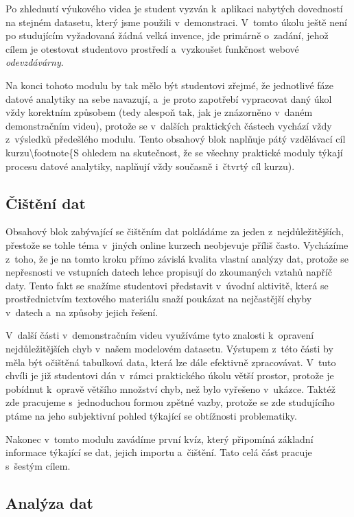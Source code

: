 Po zhlednutí výukového videa je student vyzván k~aplikaci nabytých dovedností na stejném datasetu, který jsme použili v~demonstraci. V~tomto úkolu ještě není po studujícím vyžadovaná žádná velká invence, jde primárně o~zadání, jehož cílem je otestovat studentovo prostředí a~vyzkoušet funkčnost webové \emph{odevzdávárny}.

Na konci tohoto modulu by tak mělo být studentovi zřejmé, že jednotlivé fáze datové analytiky na sebe navazují, a~je proto zapotřebí vypracovat daný úkol vždy korektním způsobem (tedy alespoň tak, jak je znázorněno v~daném demonstračním videu), protože se v~dalších praktických částech vychází vždy z~výsledků předešlého modulu. Tento obsahový blok naplňuje pátý vzdělávací cíl kurzu\textbackslash footnote\{S ohledem na skutečnost, že se všechny praktické moduly týkají procesu datové analytiky, naplňují vždy současně i~čtvrtý cíl kurzu).

\hypertarget{ux10diux161tux11bnuxed-dat}{%
\subsection{Čištění dat}\label{ux10diux161tux11bnuxed-dat}}

Obsahový blok zabývající se čištěním dat pokládáme za jeden z~nejdůležitějších, přestože se tohle téma v~jiných online kurzech neobjevuje příliš často. Vycházíme z~toho, že je na tomto kroku přímo závislá kvalita vlastní analýzy dat, protože se nepřesnosti ve vstupních datech lehce propisují do zkoumaných vztahů napříč daty. Tento fakt se snažíme studentovi představit v~úvodní aktivitě, která se prostřednictvím textového materiálu snaží poukázat na nejčastější chyby v~datech a~na způsoby jejich řešení.

V~další části v~demonstračním videu využíváme tyto znalosti k~opravení nejdůležitějších chyb v~našem modelovém datasetu. Výstupem z~této části by měla být očištěná tabulková data, která lze dále efektivně zpracovávat. V~tuto chvíli je již studentovi dán v~rámci praktického úkolu větší prostor, protože je pobídnut k~opravě většího množství chyb, než bylo vyřešeno v~ukázce. Taktéž zde pracujeme s~jednoduchou formou zpětné vazby, protože se zde studujícího ptáme na jeho subjektivní pohled týkající se obtížnosti problematiky.

Nakonec v~tomto modulu zavádíme první kvíz, který připomíná základní informace týkající se dat, jejich importu a~čištění. Tato celá část pracuje s~šestým cílem.

\hypertarget{analuxfdza-dat}{%
\subsection{Analýza dat}\label{analuxfdza-dat}}

